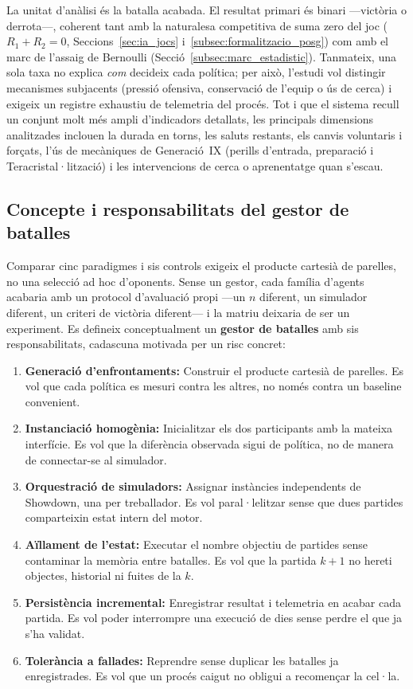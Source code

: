 La unitat d'anàlisi és la batalla acabada. El resultat primari és binari ---victòria o derrota---, coherent tant amb la naturalesa competitiva de suma zero del joc ($R_1 + R_2 = 0$, Seccions~\ref{sec:ia_jocs} i~\ref{subsec:formalitzacio_posg}) com amb el marc de l'assaig de Bernoulli (Secció~\ref{subsec:marc_estadistic}). Tanmateix, una sola taxa no explica \emph{com} decideix cada política; per això, l'estudi vol distingir mecanismes subjacents (pressió ofensiva, conservació de l'equip o ús de cerca) i exigeix un registre exhaustiu de telemetria del procés. Tot i que el sistema recull un conjunt molt més ampli d'indicadors detallats, les principals dimensions analitzades inclouen la durada en torns, les saluts restants, els canvis voluntaris i forçats, l'ús de mecàniques de Generació~IX (perills d'entrada, preparació i Teracristal·lització) i les intervencions de cerca o aprenentatge quan s'escau.

\subsection{Concepte i responsabilitats del gestor de batalles}

Comparar cinc paradigmes i sis controls exigeix el producte cartesià de parelles, no una selecció ad hoc d'oponents. Sense un gestor, cada família d'agents acabaria amb un protocol d'avaluació propi ---un $n$ diferent, un simulador diferent, un criteri de victòria diferent--- i la matriu deixaria de ser un experiment. Es defineix conceptualment un \textbf{gestor de batalles} amb sis responsabilitats, cadascuna motivada per un risc concret:

\begin{enumerate}
    \item \textbf{Generació d'enfrontaments:} Construir el producte cartesià de parelles. Es vol que cada política es mesuri contra les altres, no només contra un baseline convenient.
    \item \textbf{Instanciació homogènia:} Inicialitzar els dos participants amb la mateixa interfície. Es vol que la diferència observada sigui de política, no de manera de connectar-se al simulador.
    \item \textbf{Orquestració de simuladors:} Assignar instàncies independents de Showdown, una per treballador. Es vol paral·lelitzar sense que dues partides comparteixin estat intern del motor.
    \item \textbf{Aïllament de l'estat:} Executar el nombre objectiu de partides sense contaminar la memòria entre batalles. Es vol que la partida $k+1$ no hereti objectes, historial ni fuites de la $k$.
    \item \textbf{Persistència incremental:} Enregistrar resultat i telemetria en acabar cada partida. Es vol poder interrompre una execució de dies sense perdre el que ja s'ha validat.
    \item \textbf{Tolerància a fallades:} Reprendre sense duplicar les batalles ja enregistrades. Es vol que un procés caigut no obligui a recomençar la cel·la.
\end{enumerate}

